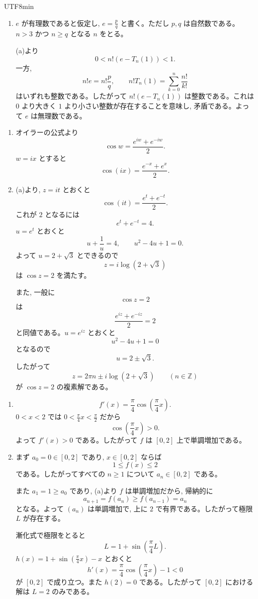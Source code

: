 \documentclass[a4paper,12pt]{article}
\newcommand{\ans}[1]{\par\vspace{0.8em}\noindent{\large 問題 #1}\quad}
\begin{document}
\begin{CJK}{UTF8}{min}
\begin{enumerate}
\item $e$ が有理数であると仮定し, $e=\frac{p}{q}$ と書く。ただし $p,q$ は自然数である。$n>3$ かつ $n\ge q$ となる $n$ をとる。

(a)より
\[
0<n!\left(e-T_n(1)\right)<1.
\]
一方,
\[
n!e=n!\frac{p}{q},\qquad
n!T_n(1)=\sum_{k=0}^{n}\frac{n!}{k!}
\]
はいずれも整数である。したがって $n!(e-T_n(1))$ は整数である。これは $0$ より大きく $1$ より小さい整数が存在することを意味し, 矛盾である。よって $e$ は無理数である。
\end{enumerate}

\ans{9}
\begin{enumerate}
\item オイラーの公式より
\[
\cos w=\frac{e^{iw}+e^{-iw}}{2}.
\]
$w=ix$ とすると
\[
\cos(ix)=\frac{e^{-x}+e^x}{2}.
\]

\item (a)より, $z=it$ とおくと
\[
\cos(it)=\frac{e^t+e^{-t}}{2}.
\]
これが $2$ となるには
\[
e^t+e^{-t}=4.
\]
$u=e^t$ とおくと
\[
u+\frac1u=4,\qquad u^2-4u+1=0.
\]
よって $u=2+\sqrt3$ とできるので
\[
z=i\log(2+\sqrt3)
\]
は $\cos z=2$ を満たす。

また, 一般に
\[
\cos z=2
\]
は
\[
\frac{e^{iz}+e^{-iz}}{2}=2
\]
と同値である。$u=e^{iz}$ とおくと
\[
u^2-4u+1=0
\]
となるので
\[
u=2\pm\sqrt3.
\]
したがって
\[
z=2\pi n\pm i\log(2+\sqrt3)\qquad (n\in\mathbb{Z})
\]
が $\cos z=2$ の複素解である。
\end{enumerate}

\ans{10}
\begin{enumerate}
\item
\[
f'(x)=\frac{\pi}{4}\cos\left(\frac{\pi}{4}x\right).
\]
$0<x<2$ では $0<\frac{\pi}{4}x<\frac{\pi}{2}$ だから
\[
\cos\left(\frac{\pi}{4}x\right)>0.
\]
よって $f'(x)>0$ である。したがって $f$ は $[0,2]$ 上で単調増加である。

\item まず $a_0=0\in[0,2]$ であり, $x\in[0,2]$ ならば
\[
1\le f(x)\le 2
\]
である。したがってすべての $n\ge 1$ について $a_n\in[0,2]$ である。

また $a_1=1\ge a_0$ であり, (a)より $f$ は単調増加だから, 帰納的に
\[
a_{n+1}=f(a_n)\ge f(a_{n-1})=a_n
\]
となる。よって $(a_n)$ は単調増加で, 上に $2$ で有界である。したがって極限 $L$ が存在する。

漸化式で極限をとると
\[
L=1+\sin\left(\frac{\pi}{4}L\right).
\]
$h(x)=1+\sin\left(\frac{\pi}{4}x\right)-x$ とおくと
\[
h'(x)=\frac{\pi}{4}\cos\left(\frac{\pi}{4}x\right)-1<0
\]
が $[0,2]$ で成り立つ。また $h(2)=0$ である。したがって $[0,2]$ における解は $L=2$ のみである。


\end{enumerate}
\end{CJK}
\end{document}
